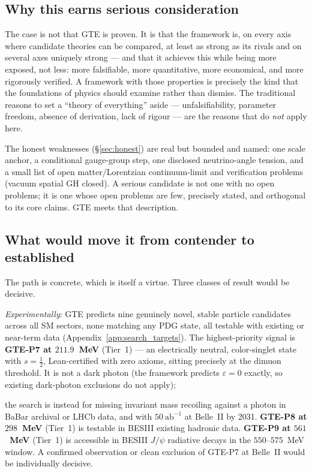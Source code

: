 \documentclass[11pt]{article}
\begin{document}
\subsection{Why this earns serious consideration}

The case is not that GTE is proven.  It is that the framework is, on every axis
where candidate theories can be compared, at least as strong as its rivals and on
several axes uniquely strong --- and that it achieves this while being more exposed,
not less: more falsifiable, more quantitative, more economical, and more rigorously
verified.  A framework with those properties is precisely the kind that the
foundations of physics should examine rather than dismiss.  The traditional reasons
to set a ``theory of everything'' aside --- unfalsifiability, parameter freedom,
absence of derivation, lack of rigour --- are the reasons that do \emph{not} apply
here.

The honest weaknesses (§\ref{sec:honest}) are real but bounded and named: one scale
anchor, a conditional gauge-group step, one disclosed neutrino-angle tension, and a
small list of open matter/Lorentzian continuum-limit and verification problems (vacuum
spatial GH closed).  A serious candidate
is not one with no open problems; it is one whose open problems are few, precisely
stated, and orthogonal to its core claims.  GTE meets that description.

\subsection{What would move it from contender to established}

The path is concrete, which is itself a virtue.  Three classes of result would be
decisive.

\emph{Experimentally}: GTE predicts nine genuinely novel, stable particle
candidates across all SM sectors, none matching any PDG state, all testable with
existing or near-term data (Appendix~\ref{app:search_targets}).  The highest-priority
signal is \textbf{GTE-P7 at $211.9$~MeV} (Tier~1) --- an electrically neutral,
color-singlet state with $s=\tfrac{1}{2}$, Lean-certified with zero axioms, sitting
precisely at the dimuon threshold.  It is not a dark photon (the framework predicts
$\varepsilon = 0$ exactly, so existing dark-photon exclusions do not apply);

the search is instead for missing invariant mass recoiling against a photon in BaBar
archival or LHCb data, and with $50~\mathrm{ab}^{-1}$ at Belle~II by 2031.
\textbf{GTE-P8 at $298$~MeV} (Tier~1) is testable in BESIII existing hadronic data.
\textbf{GTE-P9 at $561$~MeV} (Tier~1) is accessible in BESIII $J/\psi$ radiative
decays in the $550$--$575$~MeV window.  A confirmed observation or clean
exclusion of GTE-P7 at Belle~II would be individually decisive.
\end{document}
